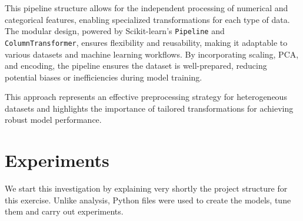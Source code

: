 	This pipeline structure allows for the independent processing of numerical and categorical features, enabling specialized transformations for each type of data. The modular design, powered by Scikit-learn’s \texttt{Pipeline} and \texttt{ColumnTransformer}, ensures flexibility and reusability, making it adaptable to various datasets and machine learning workflows. By incorporating scaling, PCA, and encoding, the pipeline ensures the dataset is well-prepared, reducing potential biases or inefficiencies during model training.
	
	This approach represents an effective preprocessing strategy for heterogeneous datasets and highlights the importance of tailored transformations for achieving robust model performance.
	
	\section{Experiments}
	
	We start this investigation by explaining very shortly the project structure for this exercise. Unlike analysis, Python files were used to create the models, tune them and carry out experiments. 
	
